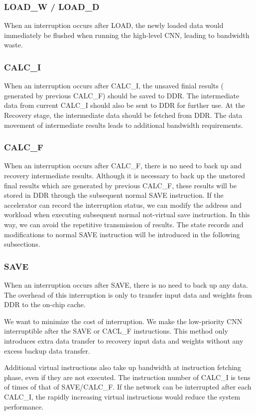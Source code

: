 \subsubsection{LOAD\_W / LOAD\_D }
When an interruption occurs after LOAD, the newly loaded data would immediately be flushed when running the high-level CNN, leading to bandwidth waste.

\subsubsection{CALC\_I} 
When an interruption occurs after CALC\_I, the unsaved finial results ( generated by previous CALC\_F) should be saved to DDR. The intermediate data from current CALC\_I should also be sent to DDR for further use. At the Recovery stage, the intermediate data should be fetched from DDR. The data movement of intermediate results leads to additional bandwidth requirements.


\subsubsection{CALC\_F}
When an interruption occurs after CALC\_F, there is no need to back up and recovery intermediate results. Although it is necessary to back up the unstored final results which are generated by previous CALC\_F, these results will be stored in DDR through the subsequent normal SAVE instruction.
If the accelerator can record the interruption status, we can modify the address and workload when executing subsequent normal not-virtual save instruction.
In this way, we can avoid the repetitive transmission of results.
The state records and modifications to normal SAVE instruction will be introduced in the following subsections.

\subsubsection{SAVE}
When an interruption occurs after SAVE, there is no need to back up any data. The overhead of this interruption is only to transfer input data and weights from DDR to the on-chip cache.

We want to minimize the cost of interruption. We make the low-priority CNN interruptible after the SAVE or CACL\_F instructions. This method only introduces extra data transfer to recovery input data and weights without any excess backup data transfer.

Additional virtual instructions also take up bandwidth at instruction fetching phase, even if they are not executed. The instruction number of CALC\_I is tens of times of that of SAVE/CALC\_F. If the network can be interrupted after each CALC\_I, the rapidly increasing virtual instructions would reduce the system performance.

